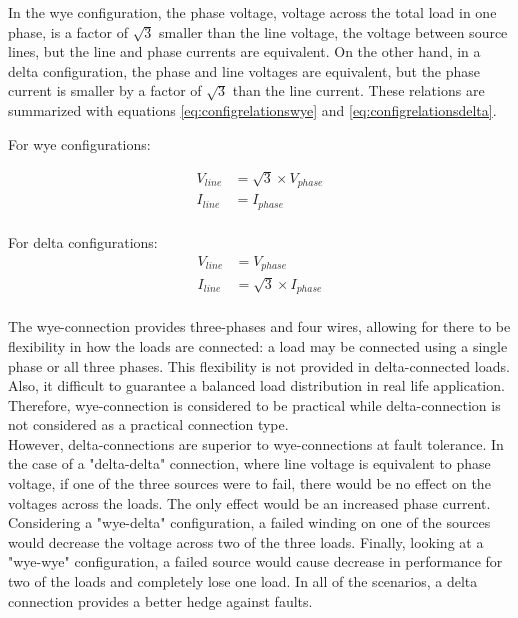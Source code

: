 \documentclass[journal]{IEEEtran}
\begin{document}
\noindent In the wye configuration, the phase voltage, voltage across the total load in one phase, is a factor of $\sqrt{3}$ smaller than the line voltage, the voltage between source lines, but the line and phase currents are equivalent. On the other hand, in a delta configuration, the phase and line voltages are equivalent, but the phase current is smaller by a factor of $\sqrt{3}$ than the line current. These relations are summarized with equations \ref{eq:configrelationswye} and \ref{eq:configrelationsdelta}. 

For wye configurations:

\begin{equation}
    \begin{split}
        V_{line} & = \sqrt{3} \times {V_{phase}}\\
        I_{line} & = I_{phase}\\
    \end{split}
    \label{eq:configrelationswye}
\end{equation}


For delta configurations:  
\begin{equation}
    \begin{split}
        V_{line} & = V_{phase}\\
        I_{line} & = \sqrt{3}\times{I_{phase}}\\
    \end{split}
    \label{eq:configrelationsdelta}
\end{equation} 

\noindent The wye-connection provides three-phases and four wires, allowing for there to be flexibility in how the loads are connected: a load may be connected using a single phase or all three phases. This flexibility is not provided in delta-connected loads. Also, it difficult to guarantee a balanced load distribution in real life application. Therefore, wye-connection is considered to be practical while delta-connection is not considered as a practical connection type.\\

\noindent However, delta-connections are superior to wye-connections at fault tolerance. In the case of a "delta-delta" connection, where line voltage is equivalent to phase voltage, if one of the three sources were to fail, there would be no effect on the voltages across the loads. The only effect would be an increased phase current. Considering a "wye-delta" configuration, a failed winding on one of the sources would decrease the voltage across two of the three loads. Finally, looking at a "wye-wye" configuration, a failed source would cause decrease in performance for two of the loads and completely lose one load. In all of the scenarios, a delta connection provides a better hedge against faults.\\ 
\end{document}
